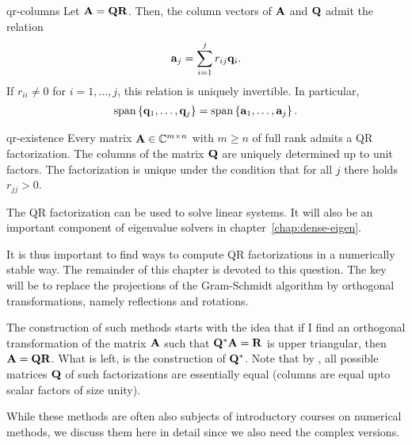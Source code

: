\begin{Lemma}{qr-columns}
  Let $\mathbf A = \mathbf Q\mathbf R$. Then, the column vectors of $\mathbf A$ and
  $\mathbf Q$ admit the relation
  \begin{gather}
    \mathbf a_j = \sum_{i=1}^j r_{ij} \mathbf q_i.
  \end{gather}
  If $r_{ii}\neq 0$ for $i=1,\dots,j$, this relation is uniquely
  invertible. In particular,
  \begin{gather}
    \operatorname{span}\left\{\mathbf q_1,\dots,\mathbf q_j\right\}
    =
    \operatorname{span}\left\{\mathbf a_1,\dots,\mathbf a_j\right\}.
  \end{gather}
\end{Lemma}

\begin{Theorem}{qr-existence}
  Every matrix $\mathbf A\in\mathbb C^{m\times n}$ with $m\ge n$ of full rank
  admits a QR factorization. The columns of the matrix $\mathbf Q$ are
  uniquely determined up to unit factors. The factorization is unique
  under the condition that for all $j$ there holds $r_{jj} > 0$.
\end{Theorem}

\begin{intro}
  The QR factorization can be used to solve linear systems. It will
  also be an important component of eigenvalue solvers in
  chapter~\ref{chap:dense-eigen}.

  It is thus important to find ways to compute QR factorizations in a
  numerically stable way. The remainder of this chapter is devoted to
  this question. The key will be to replace the projections of the
  Gram-Schmidt algorithm by orthogonal transformations, namely
  reflections and rotations.

  The construction of such methods starts with the idea that if I find
  an orthogonal transformation of the matrix $\mathbf A$ such that
  $\mathbf Q^*\mathbf A=\mathbf R$ is upper triangular, then
  $\mathbf A=\mathbf Q\mathbf R$. What is left, is the construction of
  $\mathbf Q^*$. Note that by , all
  possible matrices $\mathbf Q$ of such factorizations are essentially
  equal (columns are equal upto scalar factors of size unity).

  While these methods are often also subjects of introductory courses
  on numerical methods, we discuss them here in detail since we also
  need the complex versions.
\end{intro}

